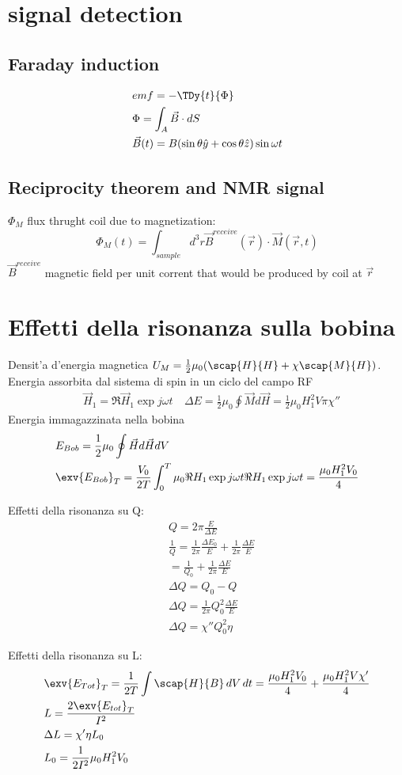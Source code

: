 \section{signal detection}
\subsection{Faraday induction}
\begin{align*}
&emf=-\TDy{t}{\Phi}\\
&\Phi=\int_A\vec{B}\cdot dS\\
&\vec{B}(t)=B(\sin{\theta}\hat{y}+\cos{\theta}\hat{z})\sin{\omega t}
\end{align*}
\subsection{Reciprocity theorem and NMR signal}
$\Phi_M$ flux thrught coil due to magnetization:
\begin{equation*}
\Phi_M(t)=\int_{sample}d^3r\vec{B}^{receive}(\vec{r})\cdot\vec{M}(\vec{r},t)
\end{equation*}
$\vec{B}^{receive}$ magnetic field per unit corrent that would be produced by coil at $\vec{r}$

\section{Effetti della risonanza sulla bobina}

Densit'a d'energia magnetica $U_M=\frac{1}{2}\mu_0(\scap{H}{H}+\chi\scap{M}{H})$.
Energia assorbita dal sistema di spin in un ciclo del campo RF
\begin{align*}
&\vec{H}_1=\Re{\vec{H}_1\exp{j\omega t}}\
&\Delta E=\frac{1}{2}\mu_0\oint\vec{M}d\vec{H}=\frac{1}{2}\mu_0H_1^2V\pi\chi''
\end{align*}
Energia immagazzinata nella bobina
\begin{align*}
&E_{Bob}=\frac{1}{2}\mu_0\oint\vec{H}d\vec{H}dV\\
&\exv{E_{Bob}}_T=\frac{V_0}{2T}\int_0^T\mu_0\Re{H_1\exp{j\omega t}}\Re{H_1\exp{j\omega t}}=\frac{\mu_0H_1^2V_0}{4}
\end{align*}

Effetti della risonanza su Q:
\begin{align*}
&Q=2\pi\frac{E}{\Delta E}\\
&\frac{1}{Q}=\frac{1}{2\pi}\frac{\Delta E_0}{E}+\frac{1}{2\pi}\frac{\Delta E}{E}\\
&=\frac{1}{Q_0}+\frac{1}{2\pi}\frac{\Delta E}{E}\\
&\Delta Q=Q_0-Q\\
&\Delta Q=\frac{1}{2\pi}Q_0^2\frac{\Delta E}{E}\\
&\Delta Q=\chi''Q_0^2\eta
\end{align*}

Effetti della risonanza su L:
\begin{align*}
&\exv{E_{Tot}}_T=\frac{1}{2T}\int\scap{H}{B}\,dV\,dt=\frac{\mu_0H_1^2V_0}{4}+\frac{\mu_0H_1^2V\chi'}{4}\\
&L=\frac{2\exv{E_{tot}}_T}{I^2}\\
&\Delta L=\chi'\eta L_0\\
&L_0=\frac{1}{2I^2}\mu_0H_1^2V_0
\end{align*}